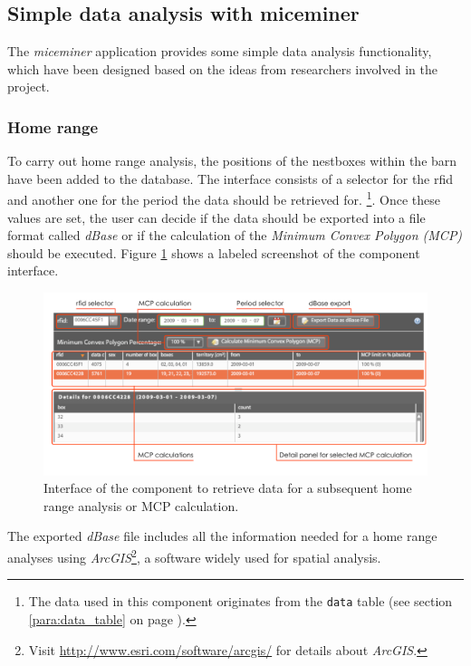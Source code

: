 \subsection{Simple data analysis with miceminer}
\label{subsec:data_ana} 

The \textit{miceminer} application provides some simple data analysis functionality, which have been designed based on the ideas from researchers involved in the project.

\subsubsection{Home range}
\label{subsubsec:homerangedata}

To carry out home range analysis, the positions of the nestboxes within the barn have been added to the database. The interface consists of a selector for the rfid and another one for the period the data should be retrieved for. \footnote{The data used in this component originates from the \lstinline|data| table (see section \ref{para:data_table} on page \pageref{para:data_table}).}. Once these values are set, the user can decide if the data should be exported into a file format called \textit{dBase} or if the calculation of the \textit{Minimum Convex Polygon (MCP)} should be executed. Figure \ref{fig:home_range} shows a labeled screenshot of the component interface.

\begin{figure}[htpb]
\begin{center}
  \includegraphics[width=.75\textwidth]{assets/pdf/home_range.pdf}
  \caption[Home range component interface]{Interface of the component to retrieve data for a subsequent home range analysis or MCP calculation.}
  \label{fig:home_range}
\end{center}
\end{figure}

The exported \textit{dBase} file includes all the information needed for a home range analyses using \textit{ArcGIS}\footnote{Visit \href{http://www.esri.com/software/arcgis/}{http://www.esri.com/software/arcgis/} for details about \textit{ArcGIS}.}, a software widely used for spatial analysis. 


